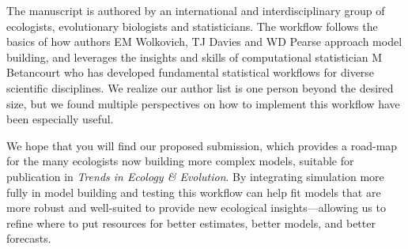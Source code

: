 \documentclass[11pt]{article}
\begin{document}

The manuscript is authored by an international and interdisciplinary group of ecologists, evolutionary biologists and statisticians. The workflow follows the basics of how authors EM Wolkovich, TJ Davies and WD Pearse approach model building, and leverages the insights and skills of computational statistician M Betancourt who has developed fundamental statistical workflows for diverse scientific disciplines. We realize our author list is one person beyond the desired size, but we found multiple perspectives on how to implement this workflow have been especially useful. %

We hope that you will find our proposed submission, which provides a road-map for the many ecologists now building more complex models, suitable for publication in \emph{Trends in Ecology \& Evolution}. By integrating simulation more fully in model building and testing this workflow can help fit models that are more robust and well-suited to provide new ecological insights---allowing us to refine where to put resources for better estimates, better models, and better forecasts. %
\end{document}
